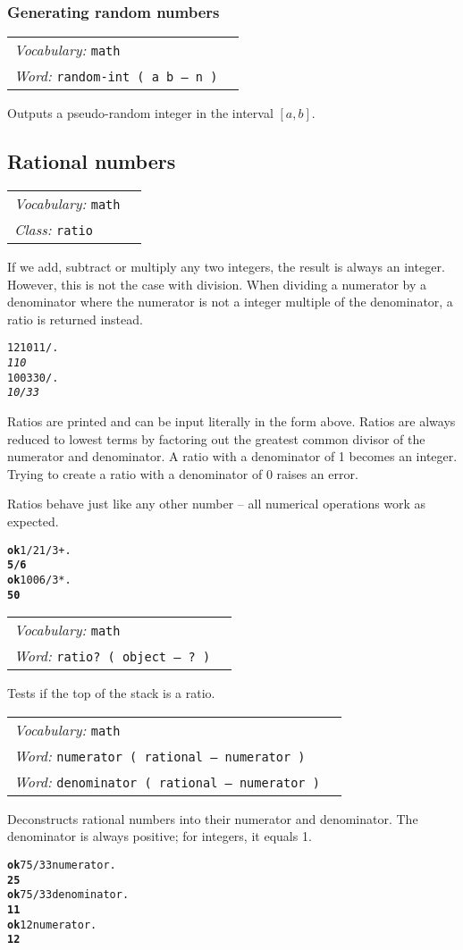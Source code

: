 \documentclass{book}
\newcommand{\vocabulary}[1]{\emph{Vocabulary:} \texttt{#1}&\\}
\newcommand{\ordinaryword}[2]{\index{\texttt{#1}}\emph{Word:} \texttt{#2}&\\}
\newcommand{\classword}[1]{\index{\texttt{#1}}\emph{Class:} \texttt{#1}&\\}
\newcommand{\predword}[1]{\ordinaryword{#1}{#1~( object -- ?~)}}
\newcommand{\wordtable}[1]{


\begin{tabularx}{12cm}{lX}
\hline
#1
\hline
\end{tabularx}

}
\begin{document}
\subsubsection{Generating random numbers}

\wordtable{
\vocabulary{math}
\ordinaryword{random-int}{random-int ( a b -- n )}
}
Outputs a pseudo-random integer in the interval $[a,b]$.

\subsection{Rational numbers}\label{ratios}

\newcommand{\rationalglos}{}
\rationalglos
\ratioglos

\wordtable{
\vocabulary{math}
\classword{ratio}
}
If we add, subtract or multiply any two integers, the result is always an integer. However, this is not the case with division. When dividing a numerator by a denominator where the numerator is not a integer multiple of the denominator, a ratio is returned instead.
\begin{alltt}
1210 11 / .
\emph{110}
100 330 / .
\emph{10/33}
\end{alltt}
Ratios are printed and can be input literally in the form above. Ratios are always reduced to lowest terms by factoring out the greatest common divisor of the numerator and denominator. A ratio with a denominator of 1 becomes an integer. Trying to create a ratio with a denominator of 0 raises an error.

Ratios behave just like any other number -- all numerical operations work as expected.
\begin{alltt}
\textbf{ok} 1/2 1/3 + .
\textbf{5/6}
\textbf{ok} 100 6 / 3 * .
\textbf{50}
\end{alltt}
\wordtable{
\vocabulary{math}
\predword{ratio?}
}
Tests if the top of the stack is a ratio.
\wordtable{
\vocabulary{math}
\ordinaryword{numerator}{numerator ( rational -- numerator )}
\ordinaryword{denominator}{denominator ( rational -- numerator )}
}
Deconstructs rational numbers into their numerator and denominator. The denominator is always positive; for integers, it equals 1.
\begin{alltt}
\textbf{ok} 75/33 numerator .
\textbf{25}
\textbf{ok} 75/33 denominator .
\textbf{11}
\textbf{ok} 12 numerator .
\textbf{12}
\end{alltt}
\end{document}
